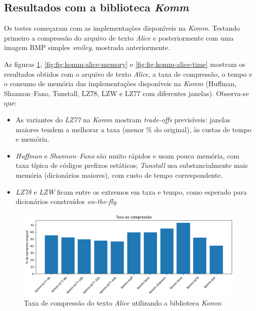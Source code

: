 \subsection{Resultados com a biblioteca \textit{Komm}}

Os testes começaram com as implementações disponíveis na \textit{Komm}. 
Testando primeiro a compressão do arquivo de texto \textit{Alice} e posteriormente com uma imagem BMP simples \textit{smiley}, mostrada anteriormente.

As figuras \ref{fig:fig:komm-alice-compression}, \ref{fig:fig:komm-alice-memory} e \ref{fig:fig:komm-alice-time} mostram os resultados obtidos com o arquivo de texto \textit{Alice}, a taxa de compressão, o tempo e o consumo de memória das implementações disponíveis na \textit{Komm} (Huffman, Shannon--Fano, Tunstall, LZ78, LZW e LZ77 com diferentes janelas). Observa-se que:
\begin{itemize}
  \item As variantes do \textit{LZ77} na \textit{Komm} mostram \textit{trade-offs} previsíveis: janelas maiores tendem a melhorar a taxa (menor \% do original), às custas de tempo e memória.
  \item \textit{Huffman} e \textit{Shannon--Fano} são muito rápidos e usam pouca memória, com taxa típica de códigos prefixos estáticos; \textit{Tunstall} usa substancialmente mais memória (dicionários maiores), com custo de tempo correspondente.
  \item \textit{LZ78} e \textit{LZW} ficam entre os extremos em taxa e tempo, como esperado para dicionários construídos \textit{on-the-fly}.
\end{itemize}


\begin{figure}[h]
	\centering
	\caption{Taxa de compressão do texto \textit{Alice} utilizando a biblioteca \textit{Komm}}
	\label{fig:fig:komm-alice-compression}
	\includegraphics[width=15cm]{figuras/komm_alice_compression.png}
\end{figure}

